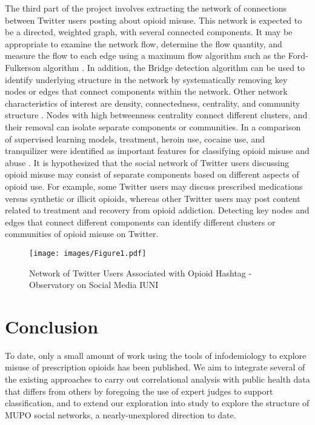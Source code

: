 \documentclass[sigconf]{acmart}
\begin{document}
The third part of the project involves extracting the network of connections 
between Twitter users posting about opioid misuse. This network is expected to 
be a directed, weighted graph, with several connected components. It may be 
appropriate to examine the network flow, determine the flow quantity, and 
measure the flow to each edge using a maximum flow algorithm such as the Ford-
Fulkerson algorithm \cite{zafarani14}. In addition, the Bridge detection 
algorithm can be used to identify underlying structure in the network by 
systematically removing key nodes or edges that connect components within the 
network. Other network characteristics of interest are density, connectedness, 
centrality, and community structure \cite{golbeck13}. Nodes with high 
betweenness centrality connect different clusters, and their removal can
isolate separate components or communities. In a comparison of supervised 
learning models, treatment, heroin use, cocaine use, and tranquilizer were 
identified as important features for classifying opioid misuse and abuse 
\cite{shiverick17}. It is hypothesized that the social network of Twitter 
users discussing opioid misuse may consist of separate components based on 
different aspects of opioid use. For example, some Twitter users may discuss 
prescribed medications versus synthetic or illicit opioids, whereas other 
Twitter users may post content related to treatment and recovery from opioid 
addiction. Detecting key nodes and edges that connect different components 
can identify different clusters or communities of opioid misuse on Twitter.

\begin{figure}[!ht]
  \centering\texttt{[image: images/Figure1.pdf]}
  \caption{Network of Twitter Users Associated with Opioid Hashtag - 
  Observatory on Social Media IUNI}
  \label{f:Figure1}
\end{figure}

\section{Conclusion}

To date, only a small amount of work using the tools of infodemiology to 
explore misuse of prescription opioids has been published. We aim to integrate 
several of the existing approaches to carry out correlational analysis with 
public health data that differs from others by foregoing the use of expert 
judges to support classification, and to extend our exploration into study to 
explore the structure of MUPO social networks, a nearly-unexplored direction 
to date. 
\end{document}
